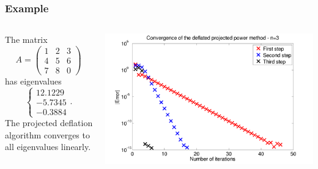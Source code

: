 \documentclass{beamer}
\begin{document}
\begin{frame}
  \frametitle{Example}


  \begin{columns}
    \begin{column}{0.35\textwidth}
      The matrix
      \begin{equation*}
        A =
        \begin{pmatrix}
          1 & 2 & 3 \\
          4 & 5 & 6 \\
          7 & 8 & 0
        \end{pmatrix}
      \end{equation*}
      has eigenvalues
      \begin{equation*}
        \left\{
          \begin{array}{c}
            12.1229\\ -5.7345\\ -0.3884
          \end{array}\right. .
      \end{equation*}
      The projected deflation algorithm converges to all eigenvalues linearly.
    \end{column}
    \begin{column}{0.65\textwidth}
      \includegraphics[width=\textwidth]{figures/ProjectionDeflation1}
    \end{column}
  \end{columns}


\end{frame}
\end{document}
